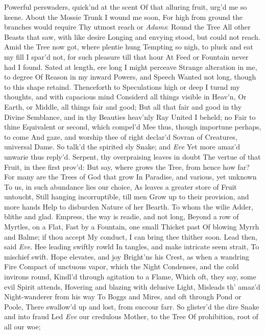 \documentclass[11pt]{book}
\newcounter {first}
\begin{document}
Powerful perswaders, quick'nd at the scent 
Of that alluring fruit, urg'd me so keene. 
About the Mossie Trunk I wound me soon, 
For high from ground the branches would require 
Thy utmost reach or \textit{Adams}: Round the Tree 
All other Beasts that saw, with like desire 
Longing and envying stood, but could not reach. 
Amid the Tree now got, where plentie hung 
Tempting so nigh, to pluck and eat my fill 
I spar'd not, for such pleasure till that hour 
At Feed or Fountain never had I found. 
Sated at length, ere long I might perceave 
Strange alteration in me, to degree 
Of Reason in my inward Powers, and Speech 
Wanted not long, though to this shape retaind. 
Thenceforth to Speculations high or deep 
I turnd my thoughts, and with capacious mind 
Considerd all things visible in Heav'n, 
Or Earth, or Middle, all things fair and good; 
But all that fair and good in thy Divine 
Semblance, and in thy Beauties heav'nly Ray 
United I beheld; no Fair to thine 
Equivalent or second, which compel'd 
Mee thus, though importune perhaps, to come 
And gaze, and worship thee of right declar'd 
Sovran of Creatures, universal Dame. 
\quad So talk'd the spirited sly Snake; and \textit{Eve} 
Yet more amaz'd unwarie thus reply'd. 
\quad Serpent, thy overpraising leaves in doubt 
The vertue of that Fruit, in thee first prov'd: 
But say, where grows the Tree, from hence how far? 
For many are the Trees of God that grow 
In Paradise, and various, yet unknown 
To us, in such abundance lies our choice, 
As leaves a greater store of Fruit untoucht, 
Still hanging incorruptible, till men 
Grow up to their provision, and more hands 
Help to disburden Nature of her Bearth. 
\quad To whom the wilie Adder, blithe and glad. 
Empress, the way is readie, and not long, 
Beyond a row of Myrtles, on a Flat, 
Fast by a Fountain, one small Thicket past 
Of blowing Myrrh and Balme; if thou accept 
My conduct, I can bring thee thither soon. 
\quad Lead then, said \textit{Eve}.  Hee leading swiftly rowld 
In tangles, and make intricate seem strait, 
To mischief swift.  Hope elevates, and joy 
Bright'ns his Crest, as when a wandring Fire 
Compact of unctuous vapor, which the Night 
Condenses, and the cold invirons round, 
Kindl'd through agitation to a Flame, 
Which oft, they say, some evil Spirit attends, 
Hovering and blazing with delusive Light, 
Misleads th' amaz'd Night-wanderer from his way 
To Boggs and Mires, and oft through Pond or Poole, 
There swallow'd up and lost, from succour farr. 
So glister'd the dire Snake and into fraud 
Led \textit{Eve} our credulous Mother, to the Tree 
Of prohibition, root of all our woe; 
\end{document}
